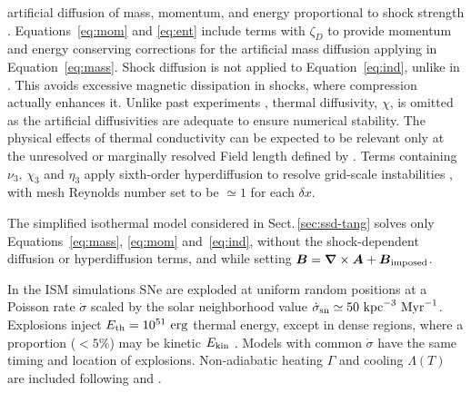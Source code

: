 \documentclass[preprint2]{aastex63}
\newcommand\SNr{\dot\sigma_{\rm sn}}
\newcommand\ESK{E_{\rm kin}}
\newcommand\EST{E_{\rm th}}
\newcommand{\vect}[1]{{{\mbox{\boldmath $#1$}}}}%
\newcommand\kpc{~ {\rm kpc}}
\newcommand\dx{ {\delta x}}
\newcommand\Myr{~ {\rm Myr}}
\newcommand\erg{~ {\rm erg}}
\newcommand{\fg}[1]{\textcolor{mypurple}{#1}}
\begin{document}
 artificial diffusion of mass, momentum, and energy proportional to shock
 strength \citep[see][for details]{GMKSH20}.
 {Equations~\eqref{eq:mom} and \eqref{eq:ent} include terms with $\zeta_D$}
 {to} {provide momentum and energy conserving corrections for} {the}
 {artificial mass diffusion applying in Equation~\eqref{eq:mass}.}
 Shock diffusion is not applied to Equation~\eqref{eq:ind}{, unlike} {in}
 {\citet{Gent:2013b}.} {This avoids} {excessive magnetic dissipation in
   shocks, where compression actually enhances it.}
  {Unlike past} experiments \citep{Gent:2013b,Gent:2013a,GMKSH20},
 thermal diffusivity, $\chi$, {is omitted as} the artificial diffusivities
 are adequate to ensure numerical stability.
 {The} physical effects of thermal conductivity can be expected to be
 relevant only at the unresolved or marginally resolved Field length defined
 by \citet[][named after George Field, not the magnetic field]{BM90}.
 Terms containing $\nu_3,\,\chi_3$ and $\eta_3$ apply sixth-order hyperdiffusion
 to resolve grid-scale instabilities \citep[see, e.g.,][]{ABGS02,HB04}, \fg{
   with mesh Reynolds number
% 
      set to be
$\simeq1$ for each $\dx$}.

 {The simplified isothermal model considered in
Sect.\,\ref{sec:ssd-tang} solves only Equations~{\eqref{eq:mass},}
 \eqref{eq:mom} and~\eqref{eq:ind}, without the shock-dependent diffusion or
 hyperdiffusion terms, and while setting
 $\vect{B}=\vect\nabla\times\vect{A}+\vect{B}_{\rm imposed}$.}

 {In the ISM simulations} SNe are exploded at {uniform} random positions
 at a Poisson rate $\dot\sigma$ {scaled by} the solar neighborhood
 value $\SNr\simeq 50\kpc^{-3}\Myr^{-1}$.
 Explosions inject $\EST = 10^{51}\erg$ thermal energy, except in
 dense regions, where a proportion {($<5\%$) may be} kinetic $\ESK$ 
 \citep[see][]{GMKSH20}.
 {Models with common $\dot\sigma$ have the same timing and location of
 explosions.}
 Non-adiabatic heating $\Gamma$ and cooling $\Lambda (T)$ are included
 \citep{Gent:2013b} following \citet{Wolfire:1995} and \citet{Sarazin:1987}.
\end{document}

